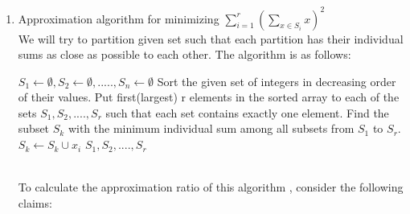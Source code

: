 \documentclass[11pt]{article}
\begin{document}
\begin{enumerate}
\begin{proof}
  This is true for opposite direction as well since a yes instance in P' is only possible when each subset square sums up to $L^2/2$. \\
  Thus, subset sum is reducible to Min squares and hence  min square is NP-Hard.
   \end{proof}
   Since, Min-Squares is both NP and NP-Hard, it is NP-Complete.\\
   \item Approximation algorithm for minimizing $\sum_{i=1}^r (\sum_{x \in S_i} x)^2$ \\
   We will try to partition given set such that each partition has their individual sums as close as possible to each other. The algorithm is as follows:
   \begin{algorithm}
  \begin{algorithmic}
      \State $S_1 \leftarrow \emptyset, S_2 \leftarrow \emptyset,.....,S_n \leftarrow \emptyset$
      \State Sort the given set of integers in decreasing order of their values.
      \State Put first(largest) r elements in the sorted array to each of the sets $S_1, S_2, ...., S_r$ such that each set contains exactly one element.
        \State Find the subset $S_k$ with the minimum individual sum among all subsets from $S_1$ to $S_r$. 
        \State $S_k \leftarrow S_k \cup {x_i}$
        \EndFor
      \State \Return $S_1, S_2, ...., S_r$
    \EndFunction
    \end{algorithmic}
    \end{algorithm}\\
    To calculate the approximation ratio of this algorithm , consider the following claims:
    

\end{enumerate}
\end{document}
